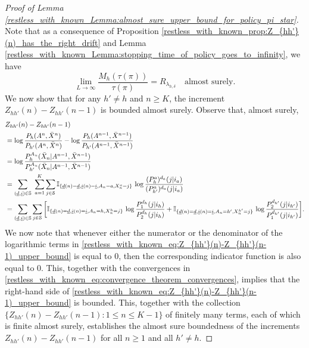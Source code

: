 \begin{proof}[Proof of Lemma \ref{restless_with_known_Lemma:almost_sure_upper_bound_for_policy_pi_star}]
Note that as a consequence of Proposition \ref{restless_with_known_prop:Z_{hh'}(n)_has_the_right_drift} and Lemma \ref{restless_with_known_Lemma:stopping_time_of_policy_goes_to_infinity}, we have 
\begin{equation}
		\lim\limits_{L\to\infty}\frac{M_{h}(\tau(\pi))}{\tau(\pi)}=
		R_{\lambda_{h,\delta}}\quad \text{almost surely}.\label{restless_with_known_eq:M_h(N(pi))/N(pi)_has_almost_correct_drift}
	\end{equation}
We now show that for any $h'\neq h$ and $n\geq K$, the increment $Z_{hh'}(n)-Z_{hh'}(n-1)$ is bounded almost surely. Observe that, almost surely,
\begin{align}
	& Z_{hh'}(n)-Z_{hh'}(n-1)\nonumber\\
	&=\log\frac{P_h(A^n,\bar{X}^n)}{P_{h'}(A^n,\bar{X}^n)}-\log\frac{P_h(A^{n-1},\bar{X}^{n-1})}{P_{h'}(A^{n-1},\bar{X}^{n-1})}\nonumber\\
	&=\log\frac{P_h^{A_n}(\bar{X}_n|A^{n-1},\bar{X}^{n-1})}{P_{h'}^{A_n}(\bar{X}_n|A^{n-1},\bar{X}^{n-1})}\nonumber\\
	&=\sum\limits_{(\underline{d},\underline{i})\in\mathbb{S}}~\sum\limits_{a=1}^{K}\sum\limits_{j\in\mathcal{S}}\mathbb{I}_{\{\underline{d}(n)=\underline{d},\underline{i}(n)=\underline{i},A_n=a,X_n^a=j\}}\,\log\frac{(P_h^a)^{d_a}(j|i_a)}{(P_{h'}^a)^{d_a}(j|i_a)}\nonumber\\
	&=\sum\limits_{(\underline{d},\underline{i})\in\mathbb{S}}\sum\limits_{j\in\mathcal{S}}\bigg[\mathbb{I}_{\{\underline{d}(n)=\underline{d},\underline{i}(n)=\underline{i},A_n=h,X_n^h=j\}}\,\log\frac{P_1^{d_h}(j|i_h)}{P_2^{d_h}(j|i_h)}+\mathbb{I}_{\{\underline{d}(n)=\underline{d},\underline{i}(n)=\underline{i},A_n=h',X_n^{h'}=j\}}\,\log\frac{P_2^{d_{h'}}(j|i_{h'})}{P_1^{d_{h'}}(j|i_{h'})}\bigg].\label{restless_with_known_eq:Z_{hh'}(n)-Z_{hh'}(n-1)_upper_bound}
\end{align}
We now note that whenever either the numerator or the denominator of the logarithmic terms in \eqref{restless_with_known_eq:Z_{hh'}(n)-Z_{hh'}(n-1)_upper_bound} is equal to $0$, then the corresponding indicator function is also equal to $0$. This, together with the convergences in \eqref{restless_with_known_eq:convergence_theorem_convergences}, implies that the right-hand side of \eqref{restless_with_known_eq:Z_{hh'}(n)-Z_{hh'}(n-1)_upper_bound} is bounded. This, together with the collection  $\{Z_{hh'}(n)-Z_{hh'}(n-1):1\leq n\leq K-1\}$ of finitely many terms, each of which is finite almost surely, establishes the almost sure boundedness of the increments $Z_{hh'}(n)-Z_{hh'}(n-1)$ for all $n\geq 1$ and all $h'\neq h$. 


\end{proof}
